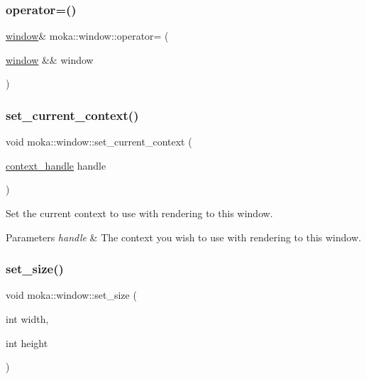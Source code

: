 \mbox{\label{classmoka_1_1window_a9628b3208bebe35dc9e2fd4b77c1cc22}} 
\subsubsection{\texorpdfstring{operator=()}{operator=()}\hspace{0.1cm}{\footnotesize\ttfamily [2/2]}}
{\footnotesize\ttfamily \mbox{\hyperlink{classmoka_1_1window}{window}}\& moka\+::window\+::operator= (\begin{DoxyParamCaption}\item[{\mbox{\hyperlink{classmoka_1_1window}{window}} \&\&}]{window }\end{DoxyParamCaption})\hspace{0.3cm}{\ttfamily [delete]}}

\mbox{\label{classmoka_1_1window_a3168db6a019dd13ffc242c8860916264}} 
\subsubsection{\texorpdfstring{set\_current\_context()}{set\_current\_context()}}
{\footnotesize\ttfamily void moka\+::window\+::set\+\_\+current\+\_\+context (\begin{DoxyParamCaption}\item[{\mbox{\hyperlink{structmoka_1_1context__handle}{context\+\_\+handle}}}]{handle }\end{DoxyParamCaption})}



Set the current context to use with rendering to this window. 


\begin{DoxyParams}{Parameters}
{\em handle} & The context you wish to use with rendering to this window. \\
\hline
\end{DoxyParams}
\mbox{\label{classmoka_1_1window_a27e22f3cc6c8cf11ee056921374fb234}} 
\subsubsection{\texorpdfstring{set\_size()}{set\_size()}}
{\footnotesize\ttfamily void moka\+::window\+::set\+\_\+size (\begin{DoxyParamCaption}\item[{int}]{width,  }\item[{int}]{height }\end{DoxyParamCaption})}



